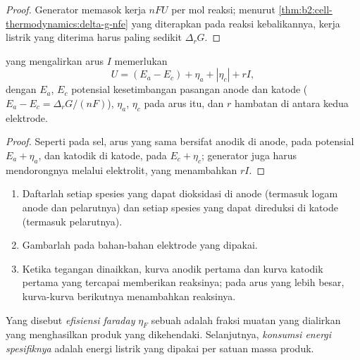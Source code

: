 \begin{proof}
Generator memasok kerja $nFU$ per mol reaksi; menurut
\cref{thm:b2:cell-thermodynamics:delta-g-nfe} yang diterapkan pada reaksi
kebalikannya, kerja listrik yang diterima harus paling sedikit
$\Delta_r G$.
\end{proof}

\begin{proposition}\label{prop:b2:batteries-electrolysis:electrolysis-voltage}
 yang mengalirkan arus $I$ memerlukan
\[
  U = (E_a - E_c) + \eta_a + |\eta_c| + rI ,
\]
dengan $E_a$, $E_c$ potensial kesetimbangan pasangan anode dan katode
($E_a - E_c = \Delta_r G/(nF)$), $\eta_a$, $\eta_c$  pada
arus itu, dan $r$ hambatan di antara kedua elektrode.
\end{proposition}

\begin{proof}
Seperti pada sel, arus yang sama bersifat anodik di anode, pada potensial
$E_a +
\eta_a$, dan katodik di katode, pada $E_c + \eta_c$; generator juga
harus mendorongnya melalui elektrolit, yang menambahkan $rI$.
\end{proof}

\begin{method}\label{met:b2:batteries-electrolysis:predict-electrolysis}
\begin{enumerate}
  \item Daftarlah setiap spesies yang dapat dioksidasi di anode (termasuk
        logam anode dan pelarutnya) dan setiap spesies yang dapat
        direduksi di katode (termasuk pelarutnya).
  \item Gambarlah  pada bahan-bahan elektrode yang
        dipakai.
  \item Ketika tegangan dinaikkan, kurva anodik pertama dan kurva katodik
        pertama yang tercapai memberikan reaksinya; pada arus yang lebih
        besar, kurva-kurva berikutnya menambahkan reaksinya.
\end{enumerate}
\end{method}

\begin{definition}\label{def:b2:batteries-electrolysis:faradaic-efficiency}
Yang disebut \emph{efisiensi faraday} $\eta_F$
sebuah  adalah fraksi muatan yang dialirkan yang menghasilkan
produk yang dikehendaki. Selanjutnya, \emph{konsumsi energi
spesifiknya} adalah energi listrik yang
dipakai per satuan massa produk.
\end{definition}

